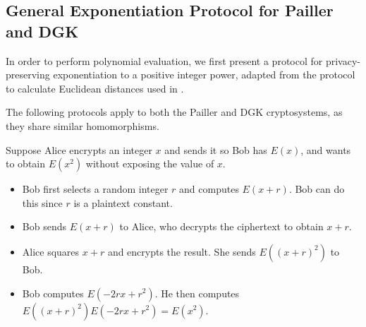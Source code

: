 
\subsection{General Exponentiation Protocol for Pailler and DGK}
In order to perform polynomial evaluation, we first present a protocol for privacy-preserving exponentiation to a positive integer power, adapted from the protocol to calculate Euclidean distances used in \cite{hutchison_privacy-preserving_2009}.

The following protocols apply to both the Pailler and DGK cryptosystems, as they share similar homomorphisms.

Suppose Alice encrypts an integer $x$ and sends it so Bob has $E(x)$, and wants to obtain $E(x^2)$ without exposing the value of $x$.
\begin{itemize}
	\item Bob first selects a random integer $r$ and computes $E(x+r)$. Bob can do this since $r$ is a plaintext constant.
	\item Bob sends $E(x+r)$ to Alice, who decrypts the ciphertext to obtain $x+r$.
	\item Alice squares $x+r$ and encrypts the result. She sends $E((x+r)^2)$ to Bob.
	\item Bob computes $E(-2rx + r^2)$. He then computes $E((x+r)^2)E(-2rx + r^2) = E(x^2)$.
\end{itemize}

